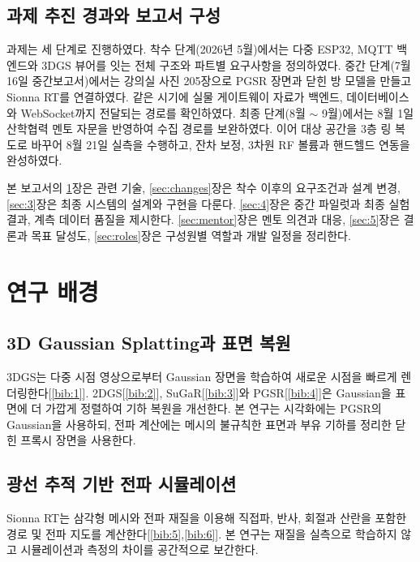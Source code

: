 \documentclass[11pt,a4paper]{article}
\begin{document}
\subsection{과제 추진 경과와 보고서 구성}
\label{sec:1.4}

과제는 세 단계로 진행하였다. 착수 단계(2026년 5월)에서는 다중 ESP32, MQTT 백엔드와 3DGS 뷰어를 잇는 전체 구조와
파트별 요구사항을 정의하였다. 중간 단계(7월 16일 중간보고서)에서는 강의실 사진 205장으로 PGSR 장면과 닫힌 방 모델을
만들고 Sionna RT를 연결하였다. 같은 시기에 실물 게이트웨이 자료가 백엔드, 데이터베이스와 WebSocket까지 전달되는 경로를
확인하였다. 최종 단계(8월 $\sim$ 9월)에서는 8월 1일 산학협력 멘토 자문을 반영하여 수집 경로를 보완하였다. 이어 대상 공간을
3층 링 복도로 바꾸어 8월 21일 실측을 수행하고, 잔차 보정, 3차원 RF 볼륨과 핸드헬드 연동을 완성하였다.

본 보고서의 \ref{sec:2}장은 관련 기술, \ref{sec:changes}장은 착수 이후의 요구조건과 설계 변경, \ref{sec:3}장은 최종 시스템의
설계와 구현을 다룬다. \ref{sec:4}장은 중간 파일럿과 최종 실험 결과, 계측 데이터 품질을 제시한다. \ref{sec:mentor}장은
멘토 의견과 대응, \ref{sec:5}장은 결론과 목표 달성도, \ref{sec:roles}장은 구성원별 역할과 개발 일정을 정리한다.

\section{연구 배경}
\label{sec:2}

\subsection{3D Gaussian Splatting과 표면 복원}
\label{sec:2.1}

3DGS는 다중 시점 영상으로부터 Gaussian 장면을 학습하여 새로운 시점을 빠르게 렌더링한다[\ref{bib:1}]. 2DGS[\ref{bib:2}],
SuGaR[\ref{bib:3}]와 PGSR[\ref{bib:4}]은 Gaussian을 표면에 더 가깝게 정렬하여 기하 복원을 개선한다. 본 연구는 시각화에는 PGSR의
Gaussian을 사용하되, 전파 계산에는 메시의 불규칙한 표면과 부유 기하를 정리한 닫힌 프록시 장면을 사용한다.

\subsection{광선 추적 기반 전파 시뮬레이션}
\label{sec:2.2}

Sionna RT는 삼각형 메시와 전파 재질을 이용해 직접파, 반사, 회절과 산란을 포함한 경로 및 전파 지도를 계산한다[\ref{bib:5},\ref{bib:6}]. 본 연구는
재질을 실측으로 학습하지 않고 시뮬레이션과 측정의 차이를 공간적으로 보간한다.
\end{document}
